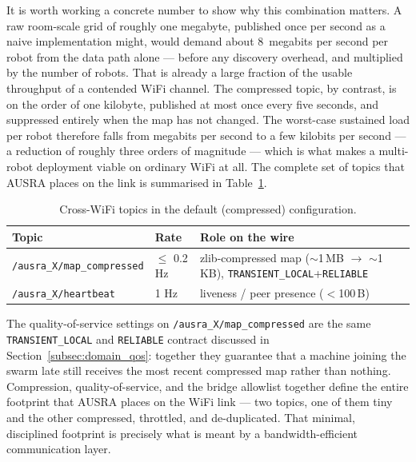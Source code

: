 It is worth working a concrete number to show why this combination matters. A raw room-scale grid of roughly one megabyte, published once per second as a naive implementation might, would demand about 8~megabits per second per robot from the data path alone --- before any discovery overhead, and multiplied by the number of robots. That is already a large fraction of the usable throughput of a contended WiFi channel. The compressed topic, by contrast, is on the order of one kilobyte, published at most once every five seconds, and suppressed entirely when the map has not changed. The worst-case sustained load per robot therefore falls from megabits per second to a few kilobits per second --- a reduction of roughly three orders of magnitude --- which is what makes a multi-robot deployment viable on ordinary WiFi at all. The complete set of topics that AUSRA places on the link is summarised in Table~\ref{tab:cross_wifi_topics}.

\begin{table}[H]
    \centering
    \caption{Cross-WiFi topics in the default (compressed) configuration.}
    \label{tab:cross_wifi_topics}
    \begin{tabularx}{\textwidth}{@{}l l X@{}}
        \toprule
        \textbf{Topic} & \textbf{Rate} & \textbf{Role on the wire} \\
        \midrule
        \texttt{/ausra\_X/map\_compressed} & $\leq$ 0.2 Hz & zlib-compressed map ($\sim$1\,MB $\rightarrow$ $\sim$1\,KB), \texttt{TRANSIENT\_LOCAL}+\texttt{RELIABLE} \\
        \texttt{/ausra\_X/heartbeat} & 1 Hz & liveness / peer presence ($<$100\,B) \\
        \bottomrule
    \end{tabularx}
\end{table}

The quality-of-service settings on \texttt{/ausra\_X/map\_compressed} are the same \texttt{TRANSIENT\_LOCAL} and \texttt{RELIABLE} contract discussed in Section~\ref{subsec:domain_qos}: together they guarantee that a machine joining the swarm late still receives the most recent compressed map rather than nothing. Compression, quality-of-service, and the bridge allowlist together define the entire footprint that AUSRA places on the WiFi link --- two topics, one of them tiny and the other compressed, throttled, and de-duplicated. That minimal, disciplined footprint is precisely what is meant by a bandwidth-efficient communication layer.

